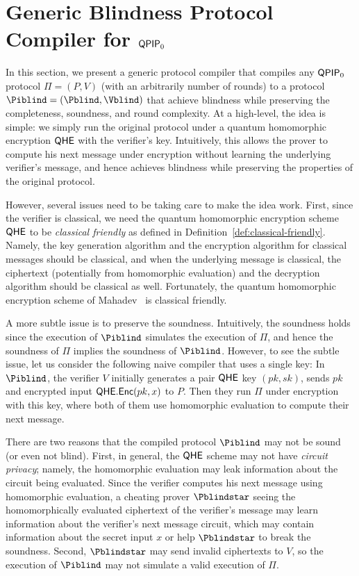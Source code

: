 \section{Generic Blindness Protocol Compiler for $\operatorname{\mathsf{QPIP}}_0$}
\label{sec:BlindBQP2}

In this section, we present a generic protocol compiler that compiles any $\operatorname{\mathsf{QPIP}}_0$ protocol $\Pi = (P, V)$ (with an arbitrarily number of rounds) to a protocol $\Piblind = (\Pblind, \Vblind)$ that achieve blindness while preserving the completeness, soundness, and round complexity. At a high-level, the idea is simple: we simply run the original protocol under a quantum homomorphic encryption $\mathsf{QHE}$ with the verifier's key. Intuitively, this allows the prover to compute his next message under encryption without learning the underlying verifier's message, and hence achieves blindness while preserving the properties of the original protocol.

However, several issues need to be taking care to make the idea work. First, since the verifier is classical, we need the quantum homomorphic encryption scheme $\mathsf{QHE}$ to be \emph{classical friendly} as defined in Definition~\ref{def:classical-friendly}. Namely, the key generation algorithm and the encryption algorithm for classical messages should be classical, and when the underlying message is classical, the ciphertext (potentially from homomorphic evaluation) and the decryption algorithm should be classical as well. Fortunately, the quantum homomorphic encryption scheme of Mahadev~\cite{mahadev_qfhe} is classical friendly.

A more subtle issue is to preserve the soundness. Intuitively, the soundness holds since the execution of $\Piblind$ simulates the execution of $\Pi$, and hence the soundness of $\Pi$ implies the soundness of $\Piblind$. However, to see the subtle issue, let us consider the following naive compiler that uses a single key: In $\Piblind$,  the verifier $V$ initially generates a pair $\mathsf{QHE}$ key $(pk, sk)$, sends $pk$ and encrypted input $\mathsf{QHE.Enc}(pk,x)$ to $P$. Then they run $\Pi$ under encryption with this key, where both of them use homomorphic evaluation to compute their next message.

There are two reasons that the compiled protocol $\Piblind$ may not be sound (or even not blind). First, in general, the $\mathsf{QHE}$ scheme may not have \emph{circuit privacy}; namely, the homomorphic evaluation may leak information about the circuit being evaluated. Since the verifier computes his next message using homomorphic evaluation, a cheating prover $\Pblindstar$ seeing the homomorphically evaluated ciphertext of the verifier's message may learn information about the verifier's next message circuit, which may contain information about the secret input $x$ or help $\Pblindstar$ to break the soundness. Second, $\Pblindstar$ may send invalid ciphertexts to $V$, so the execution of $\Piblind$ may not simulate a valid execution of $\Pi$.

